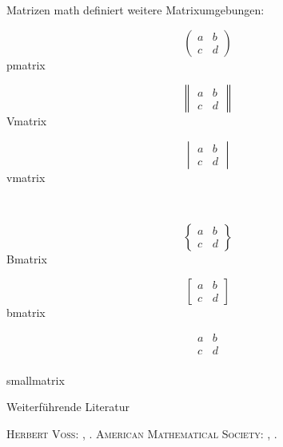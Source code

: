\documentclass[
	vorläufig=true,
	datum=2016-11-04,
	titel={Mathematiksatz I},
	web=false,
]{../tex/latexkurs-slides}
\begin{document}
\begin{frame}[fragile]{Matrizen}
\AmS math definiert weitere Matrixumgebungen:\\[2em]
\begin{minipage}{3cm}
\[\begin{pmatrix}
a & b \\ c & d
\end{pmatrix}\]
\centering pmatrix
\end{minipage}
\begin{minipage}{3cm}
\[\begin{Vmatrix}
a & b \\ c & d
\end{Vmatrix}\]
\centering Vmatrix
\end{minipage}
\begin{minipage}{3cm}
\[\begin{vmatrix}
a & b \\ c & d
\end{vmatrix}\]
\centering vmatrix
\end{minipage}
\\[2em]
\begin{minipage}{3cm}
\[\begin{Bmatrix}
a & b \\ c & d
\end{Bmatrix}\]
\centering Bmatrix
\end{minipage}
\begin{minipage}{3cm}
\[\begin{bmatrix}
a & b \\ c & d
\end{bmatrix}\]
\centering bmatrix
\end{minipage}
\begin{minipage}{3cm}
\[\begin{smallmatrix}
a & b \\ c & d
\end{smallmatrix}\]\\
\centering smallmatrix
\end{minipage}
\end{frame}

\begin{frame}{Weiterführende Literatur}
	\begin{thebibliography}{9}
		 \textsc{Herbert Voss}:
			, 
			.
		 \textsc{American Mathematical Society}:
			, 
			.
	\end{thebibliography}
\end{frame}


\end{document}
